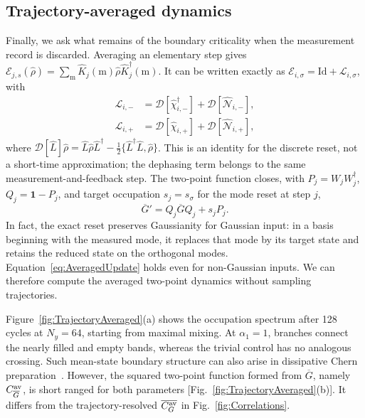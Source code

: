 \documentclass[aps,prb,10pt,twocolumn,superscriptaddress,longbibliography,floatfix]{revtex4-2}
\newcommand{\mc}[1]{\mathcal{#1}}
\newcommand{\Id}{\mathbf{1}}
\newcommand{\claudeadd}[1]{{\color{orange}#1}}
\begin{document}
{\color{blue}
\subsection{Trajectory-averaged dynamics}
\label{sec:TrajectoryAveraged}

Finally, we ask what remains of the boundary criticality when the measurement record is discarded. Averaging an elementary step gives $\mc E_{j,s}(\hat\rho)=\sum_{\mathrm m}\hat K_j(\mathrm m)\hat\rho\hat K_j^\dagger(\mathrm m)$. It can be written exactly as $\mc E_{i,\sigma}=\mathrm{Id}+\mc L_{i,\sigma}$, with
\begin{align}
 \mc L_{i,-}&=\mc D[\hat\chi_{i,-}^\dagger]+\mc D[\hat{\mc N}_{i,-}],\nonumber\\
 \mc L_{i,+}&=\mc D[\hat\chi_{i,+}]+\mc D[\hat{\mc N}_{i,+}],
 \label{eq:AveragedChannel}
\end{align}
where $\mc D[\hat L]\hat\rho=\hat L\hat\rho\hat L^\dagger-\tfrac12\{\hat L^\dagger\hat L,\hat\rho\}$. This is an identity for the discrete reset, not a short-time approximation; the dephasing term belongs to the same measurement-and-feedback step. The two-point function closes, with \claudeadd{$P_j=W_jW_j^\dagger$}, $Q_j=\Id-P_j$, and target occupation $s_j=s_\sigma$ for the mode reset at step $j$,
\begin{equation}
 \overline G'=Q_j\overline GQ_j+s_jP_j.
 \label{eq:AveragedUpdate}
\end{equation}
In fact, the exact reset preserves Gaussianity for Gaussian input: in a basis beginning with the measured mode, it replaces that mode by its target state and retains the reduced state on the orthogonal modes. Equation~\eqref{eq:AveragedUpdate} holds even for non-Gaussian inputs. We can therefore compute the averaged two-point dynamics without sampling trajectories.

Figure~\ref{fig:TrajectoryAveraged}(a) shows the occupation spectrum after 128 cycles at $N_y=64$, starting from maximal mixing. At $\alpha_1=1$, branches connect the nearly filled and empty bands, whereas the trivial control has no analogous crossing. Such mean-state boundary structure can also arise in dissipative Chern preparation~\cite{Goldstein2019}. However, the squared two-point function formed from $\overline G$, namely $C_{\overline G}^{\rm av}$, is short ranged for both parameters [Fig.~\ref{fig:TrajectoryAveraged}(b)]. It differs from the trajectory-resolved $\overline{C_G^{\rm av}}$ in Fig.~\ref{fig:Correlations}.

}
\end{document}
